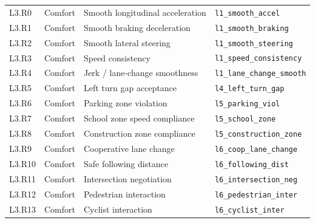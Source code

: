 \begin{table}[h]
\begin{tabular}{llp{4.5cm}p{3.5cm}}
L3.R0 & Comfort & Smooth longitudinal acceleration & \texttt{\footnotesize l1\_smooth\_accel} \\
L3.R1 & Comfort & Smooth braking deceleration & \texttt{\footnotesize l1\_smooth\_braking} \\
L3.R2 & Comfort & Smooth lateral steering & \texttt{\footnotesize l1\_smooth\_steering} \\
L3.R3 & Comfort & Speed consistency & \texttt{\footnotesize l1\_speed\_consistency} \\
L3.R4 & Comfort & Jerk / lane-change smoothness & \texttt{\footnotesize l1\_lane\_change\_smooth} \\
L3.R5 & Comfort & Left turn gap acceptance & \texttt{\footnotesize l4\_left\_turn\_gap} \\
L3.R6 & Comfort & Parking zone violation & \texttt{\footnotesize l5\_parking\_viol} \\
L3.R7 & Comfort & School zone speed compliance & \texttt{\footnotesize l5\_school\_zone} \\
L3.R8 & Comfort & Construction zone compliance & \texttt{\footnotesize l5\_construction\_zone} \\
L3.R9 & Comfort & Cooperative lane change & \texttt{\footnotesize l6\_coop\_lane\_change} \\
L3.R10 & Comfort & Safe following distance & \texttt{\footnotesize l6\_following\_dist} \\
L3.R11 & Comfort & Intersection negotiation & \texttt{\footnotesize l6\_intersection\_neg} \\
L3.R12 & Comfort & Pedestrian interaction & \texttt{\footnotesize l6\_pedestrian\_inter} \\
L3.R13 & Comfort & Cyclist interaction & \texttt{\footnotesize l6\_cyclist\_inter} \\
\bottomrule
\end{tabular}
\vspace{1mm}

\end{table}
